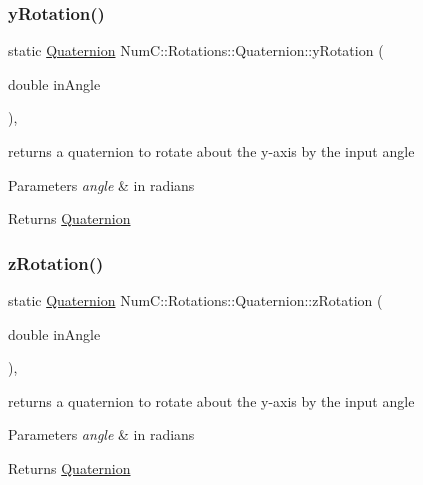 \subsubsection{\texorpdfstring{y\+Rotation()}{yRotation()}}
{\footnotesize\ttfamily static \mbox{\hyperlink{class_num_c_1_1_rotations_1_1_quaternion}{Quaternion}} Num\+C\+::\+Rotations\+::\+Quaternion\+::y\+Rotation (\begin{DoxyParamCaption}\item[{double}]{in\+Angle }\end{DoxyParamCaption})\hspace{0.3cm}{\ttfamily [inline]}, {\ttfamily [static]}}

returns a quaternion to rotate about the y-\/axis by the input angle


\begin{DoxyParams}{Parameters}
{\em angle} & in radians \\
\hline
\end{DoxyParams}
\begin{DoxyReturn}{Returns}
\mbox{\hyperlink{class_num_c_1_1_rotations_1_1_quaternion}{Quaternion}} 
\end{DoxyReturn}
\mbox{\label{class_num_c_1_1_rotations_1_1_quaternion_a7f88c89f0597873a10fec577bb763873}} 
\subsubsection{\texorpdfstring{z\+Rotation()}{zRotation()}}
{\footnotesize\ttfamily static \mbox{\hyperlink{class_num_c_1_1_rotations_1_1_quaternion}{Quaternion}} Num\+C\+::\+Rotations\+::\+Quaternion\+::z\+Rotation (\begin{DoxyParamCaption}\item[{double}]{in\+Angle }\end{DoxyParamCaption})\hspace{0.3cm}{\ttfamily [inline]}, {\ttfamily [static]}}

returns a quaternion to rotate about the y-\/axis by the input angle


\begin{DoxyParams}{Parameters}
{\em angle} & in radians \\
\hline
\end{DoxyParams}
\begin{DoxyReturn}{Returns}
\mbox{\hyperlink{class_num_c_1_1_rotations_1_1_quaternion}{Quaternion}} 
\end{DoxyReturn}



